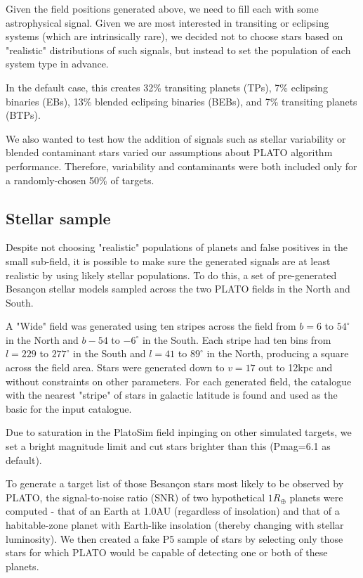 \documentclass{article}
\begin{document}
Given the field positions generated above, we need to fill each with some astrophysical signal. 
Given we are most interested in transiting or eclipsing systems (which are intrinsically rare), we decided not to choose stars based on "realistic" distributions of such signals, but instead to set the population of each system type in advance.

In the default case, this creates 32\% transiting planets (TPs), 7\% eclipsing binaries (EBs), 13\% blended eclipsing binaries (BEBs), and 7\% transiting planets (BTPs).

We also wanted to test how the addition of signals such as stellar variability or blended contaminant stars varied our assumptions about PLATO algorithm performance.
Therefore, variability and contaminants were both included only for a randomly-chosen 50\% of targets.

\subsection{Stellar sample}
Despite not choosing "realistic" populations of planets and false positives in the small sub-field, it is possible to make sure the generated signals are at least realistic by using likely stellar populations.
To do this, a set of pre-generated Besan\c{c}on stellar models sampled across the two PLATO fields in the North and South.

A "Wide" field was generated using ten stripes across the field from $b=6$ to $54^{\circ}$ in the North and $b-54$ to $-6^{\circ}$ in the South. 
Each stripe had ten bins from $l=229$ to $277^{\circ}$ in the South and $l=41$ to $89^{\circ}$ in the North, producing a square across the field area.
Stars were generated down to $v=17$ out to 12kpc and without constraints on other parameters.
For each generated field, the catalogue with the nearest "stripe" of stars in galactic latitude is found and used as the basic for the input catalogue.

Due to saturation in the PlatoSim field inpinging on other simulated targets, we set a bright magnitude limit and cut stars brighter than this (Pmag=6.1 as default).

To generate a target list of those Besan\c{c}on stars most likely to be observed by PLATO, the signal-to-noise ratio (SNR) of two hypothetical $1R_\oplus$ planets were computed - that of an Earth at 1.0AU (regardless of insolation) and that of a habitable-zone planet with Earth-like insolation (thereby changing with stellar luminosity). 
We then created a fake P5 sample of stars by selecting only those stars for which PLATO would be capable of detecting one or both of these planets.
\end{document}
